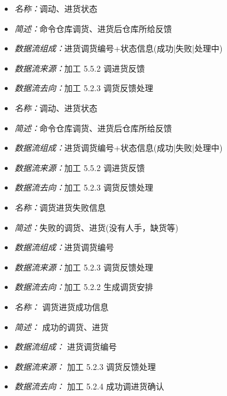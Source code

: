 \vspace{-1mm}

\begin{itemize}
\item \textit{名称：}调动、进货状态
	\item \textit{简述：}命令仓库调货、进货后仓库所给反馈
	\item \textit{数据流组成：}进货调货编号+状态信息(成功|失败|处理中)
	\item \textit{数据流来源：}加工 5.5.2 调进货反馈
	\item \textit{数据流去向：}加工 5.2.3 调货反馈处理
\end{itemize}

\vspace{-1mm}

\begin{itemize}
\item \textit{名称：}调动、进货状态
	\item \textit{简述：}命令仓库调货、进货后仓库所给反馈
	\item \textit{数据流组成：}进货调货编号+状态信息(成功|失败|处理中)
	\item \textit{数据流来源：}加工 5.5.2 调进货反馈
	\item \textit{数据流去向：}加工 5.2.3 调货反馈处理
\end{itemize}

\vspace{-1mm}

\begin{itemize}
\item \textit{名称：}调货进货失败信息
	\item \textit{简述：}失败的调货、进货(没有人手，缺货等)
	\item \textit{数据流组成：}进货调货编号
	\item \textit{数据流来源：}加工 5.2.3 调货反馈处理
	\item \textit{数据流去向：}加工 5.2.2 生成调货安排
\end{itemize}

\vspace{-1mm}

\begin{itemize}
\item \textit{名称： }调货进货成功信息 
\item \textit{简述： }成功的调货、进货 
\item \textit{数据流组成： }进货调货编号 
\item \textit{数据流来源： }加工 5.2.3 调货反馈处理 
\item \textit{数据流去向： }加工 5.2.4 成功调进货确认

\end{itemize}


